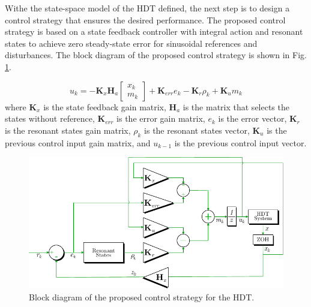 Withe the state-space model of the HDT defined, the next step is to design a control strategy that ensures the desired performance. The proposed control strategy is based on a state feedback controller with integral action and resonant states to achieve zero steady-state error for sinusoidal references and disturbances. The block diagram of the proposed control strategy is shown in Fig. \ref{fig:Control_Diagram}.

\begin{equation}
    u_k = -\mathbf{K}_x \mathbf{H}_a
    \begin{bmatrix}
        x_k\\
        m_k
    \end{bmatrix} + \mathbf{K}_{err}e_k - \mathbf{K}_r \rho_k + \mathbf{K}_u m_k
\end{equation}
where $\mathbf{K}_x$ is the state feedback gain matrix, $\mathbf{H}_a$ is the matrix that selects the states without reference, $\mathbf{K}_{err}$ is the error gain matrix, $e_k$ is the error vector, $\mathbf{K}_r$ is the resonant states gain matrix, $\rho_k$ is the resonant states vector, $\mathbf{K}_u$ is the previous control input gain matrix, and $u_{k - 1}$ is the previous control input vector.

\begin{figure}[t!]
    \centering
    \includegraphics[width=\columnwidth]{Images/Control_Diagram.pdf} 
    \caption{Block diagram of the proposed control strategy for the HDT.}
    \label{fig:Control_Diagram}
\end{figure}

